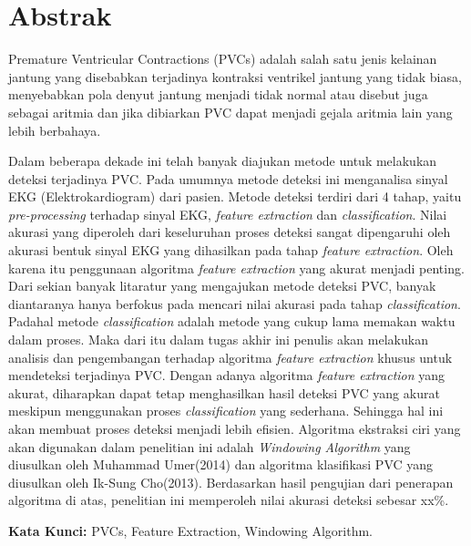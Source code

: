 \chapter*{Abstrak}
Premature Ventricular Contractions (PVCs) adalah salah satu jenis kelainan jantung yang disebabkan terjadinya kontraksi ventrikel jantung yang tidak biasa, menyebabkan pola denyut jantung menjadi tidak normal atau disebut juga sebagai aritmia dan jika dibiarkan PVC dapat menjadi gejala aritmia lain yang lebih berbahaya. 

Dalam beberapa dekade ini telah banyak diajukan metode untuk melakukan deteksi terjadinya PVC. Pada umumnya metode deteksi ini menganalisa sinyal EKG (Elektrokardiogram) dari pasien. Metode deteksi terdiri dari 4 tahap, yaitu \textit{pre-processing} terhadap sinyal EKG, \textit{feature extraction} dan  \textit{classification}. 
Nilai akurasi yang diperoleh dari keseluruhan proses deteksi sangat dipengaruhi oleh akurasi bentuk sinyal EKG yang dihasilkan pada tahap \textit{feature extraction}. Oleh karena itu penggunaan algoritma \textit{feature extraction} yang akurat menjadi penting. Dari sekian banyak litaratur yang mengajukan metode deteksi PVC, banyak diantaranya hanya berfokus pada mencari nilai akurasi pada tahap \textit{classification}. Padahal metode \textit{classification} adalah metode yang cukup lama memakan waktu dalam proses. 
Maka dari itu dalam tugas akhir ini penulis akan melakukan analisis dan pengembangan terhadap algoritma \textit{feature extraction} khusus untuk mendeteksi terjadinya PVC. Dengan adanya algoritma \textit{feature extraction} yang akurat, diharapkan dapat tetap menghasilkan hasil deteksi PVC yang akurat meskipun menggunakan proses \textit{classification} yang sederhana. Sehingga hal ini akan membuat proses deteksi menjadi lebih efisien. 
Algoritma ekstraksi ciri yang akan digunakan dalam penelitian ini adalah \textit{Windowing Algorithm} yang diusulkan oleh Muhammad Umer(2014) dan algoritma klasifikasi PVC yang diusulkan oleh Ik-Sung Cho(2013). Berdasarkan hasil pengujian dari penerapan algoritma di atas, penelitian ini memperoleh nilai akurasi deteksi sebesar xx\%.
  
\vspace{0.5 cm}
\begin{flushleft}
{\textbf{Kata Kunci:} PVCs, Feature Extraction, Windowing Algorithm.}
\end{flushleft}